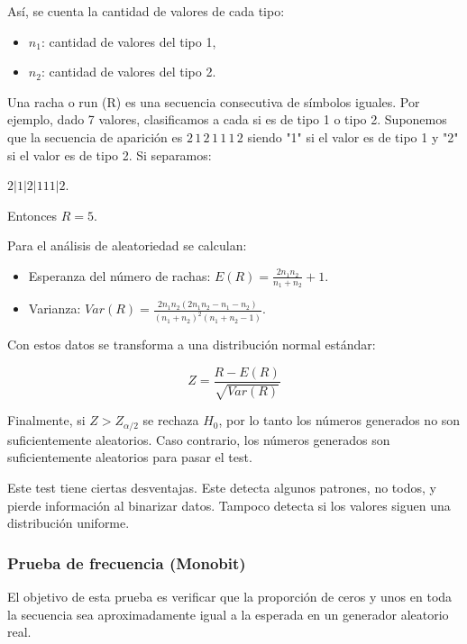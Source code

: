 \documentclass{article}
\begin{document}
Así, se cuenta la cantidad de valores de cada tipo:

\begin{itemize}
  \item $n_1$: cantidad de valores del tipo 1,
  \item $n_2$: cantidad de valores del tipo 2.
\end{itemize}

Una racha o run (R) es una secuencia consecutiva de símbolos iguales. Por ejemplo, dado 7 valores, clasificamos a cada si es de tipo 1 o tipo 2. Suponemos que la secuencia de aparición es $2\,1\,2\,1\,1\,1\,2$ siendo "1" si el valor es de tipo 1 y "2" si el valor es de tipo 2. Si separamos:

$2|1|2|111|2$.

Entonces $R = 5$.

Para el análisis de aleatoriedad se calculan:

\begin{itemize}
  \item Esperanza del número de rachas: $E(R) = \frac{2n_1n_2}{n_1+n_2} + 1$.
  \item Varianza:
  $Var(R) = \frac{2n_1n_2\left(2n_1n_2 - n_1 - n_2\right)}
  {(n_1+n_2)^2 (n_1+n_2-1)}$.
\end{itemize}

Con estos datos se transforma a una distribución normal estándar:

\begin{equation}
  Z = \frac{R - E(R)}
  {\sqrt{Var(R)}}
\end{equation}

Finalmente, si $Z > Z_{\alpha/2}$ se rechaza $H_0$, por lo tanto los números generados no son suficientemente aleatorios. Caso contrario, los números generados son suficientemente aleatorios para pasar el test.

Este test tiene ciertas desventajas. Este detecta algunos patrones, no todos, y pierde información al binarizar datos. Tampoco detecta si los valores siguen una distribución uniforme.

\subsubsection{Prueba de frecuencia (Monobit)}

El objetivo de esta prueba es verificar que la proporción de ceros y unos en toda la secuencia sea aproximadamente igual a la esperada en un generador aleatorio real.
\end{document}
